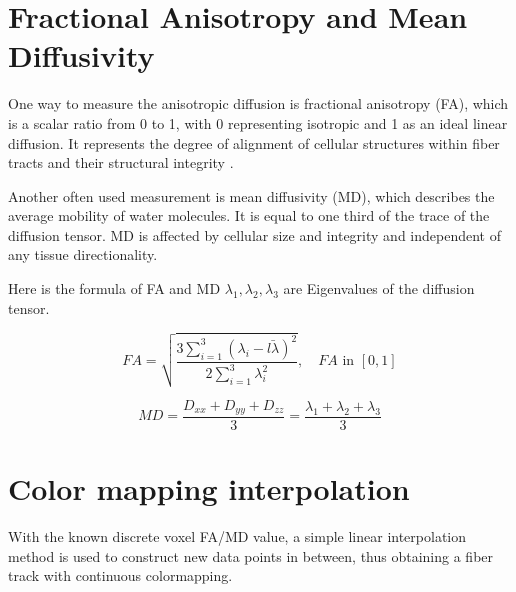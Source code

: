 \documentclass[a4paper, 12pt]{report}
\begin{document}
\section{Fractional Anisotropy and Mean Diffusivity }
One way to measure the anisotropic diffusion is fractional anisotropy (FA), which is a scalar ratio from 0 to 1, with 0 representing isotropic and 1 as an ideal linear diffusion. It represents the degree of alignment of cellular structures within fiber tracts and their structural integrity \cite{cer}.

Another often used measurement is mean diffusivity (MD), which describes the average mobility of water molecules. It is equal to one third of the trace of the diffusion tensor. MD is affected by cellular size and integrity and independent of any tissue directionality. \cite{cer}

Here is the formula of FA and MD $\lambda_1, \lambda_2, \lambda_3$  are Eigenvalues of the diffusion tensor.

\begin{equation*}
	FA=\sqrt{\frac{3 \sum_{i=1}^{3}(\lambda_i-\bar{l\lambda})^2}{2\sum_{i=1}^3\lambda_i^2}}, \quad FA\text{ in } [0,1]
\end{equation*}

\begin{equation*}
	MD=\frac{D_{xx}+D_{yy}+D_{zz}}{3}= \frac{\lambda_1+\lambda_2+\lambda_3}{3}
\end{equation*}

\section{ Color mapping interpolation }
With the known discrete voxel FA/MD value, a simple linear interpolation method is used to construct new data points in between, thus obtaining a fiber track with continuous colormapping.
\end{document}
